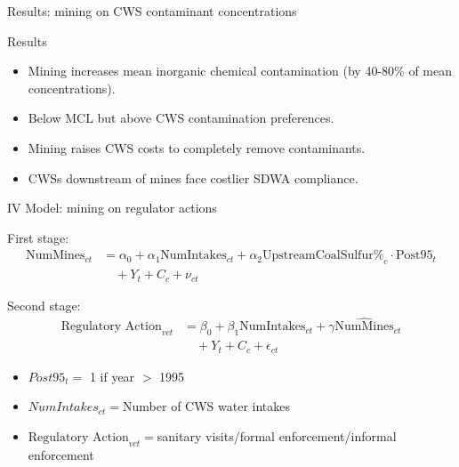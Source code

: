 \documentclass{beamer}
\begin{document}
\begin{frame}{Results: mining on CWS contaminant concentrations}
    
\end{frame}

\begin{frame}{Results}
\begin{itemize}
    \item Mining increases mean inorganic chemical contamination (by 40-80\% of mean concentrations).
    \item Below MCL but above CWS contamination preferences.
    \item Mining raises CWS costs to completely remove contaminants.
    \item CWSs downstream of mines face costlier SDWA compliance. 
\end{itemize}
\end{frame}

\begin{frame}{IV Model: mining on regulator actions}

First stage:
\begin{equation}\label{1ststage2sls}
\begin{split}
\text{NumMines}_{ct} &= \alpha_0 + \alpha_1\text{NumIntakes}_{ct} + \alpha_2\text{UpstreamCoalSulfur\%}_c \cdot \text{Post95}_t \\
&\quad + Y_t + C_c + \nu_{ct}
\end{split}
\end{equation}

Second stage:
\begin{equation}\label{2ndstage2sls}
\begin{split}
\text{Regulatory Action}_{vct} &= \beta_0 + \beta_1\text{NumIntakes}_{ct} + \gamma\widehat{\text{NumMines}}_{ct} \\
&\quad + Y_t + C_c + \epsilon_{ct}
\end{split}
\end{equation}

\begin{itemize}
    \begin{itemize}
        \item $Post95_t=$ 1 if year $>$ 1995 
        \item $NumIntakes_{ct}=$Number of CWS water intakes
        \item $\text{Regulatory Action}_{vct}=$sanitary visits/formal enforcement/informal enforcement
    \end{itemize}
\end{itemize}
\end{frame}
\end{document}
